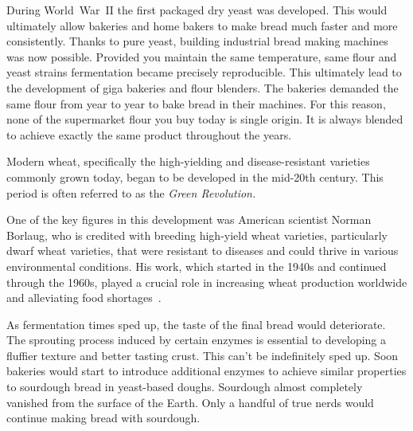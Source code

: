 During World~War~II the first packaged dry yeast was developed. This would
ultimately allow bakeries and home bakers to make bread much faster and more
consistently. Thanks to pure yeast, building industrial bread making machines
was now possible. Provided you maintain the same temperature, same flour and
yeast strains fermentation became precisely reproducible. This ultimately lead
to the development of giga bakeries and flour blenders. The bakeries demanded
the same flour from year to year to bake bread in their machines.  For this
reason, none of the supermarket flour you buy today is single origin.  It is
always blended to achieve exactly the same product throughout the years.

Modern wheat, specifically the high-yielding and disease-resistant varieties
commonly grown today, began to be developed in the mid-20th century. This
period is often referred to as the \emph{Green Revolution.}

One of the key figures in this development was American scientist Norman
Borlaug, who is credited with breeding high-yield wheat varieties,
particularly dwarf wheat varieties, that were resistant to diseases and could
thrive in various environmental conditions. His work, which started in the
1940s and continued through the \num{1960}s, played a crucial role in
increasing wheat production worldwide and alleviating food
shortages~\cite{green+revolution}.

As fermentation
times sped up, the taste of the final bread would deteriorate.
The sprouting process induced by certain enzymes is essential
to developing a fluffier texture and better tasting crust. This
can't be indefinitely sped up. Soon bakeries would start
to introduce additional enzymes to achieve similar properties
to sourdough bread in yeast-based doughs. Sourdough almost completely
vanished from the surface of the Earth. Only a handful
of true nerds would continue making bread with sourdough.

